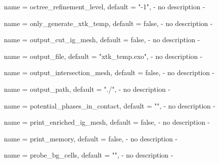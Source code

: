 \begin{parameter}{
    name    = {octree_refinement_level},
    default = {"-1"},
}
- no description -
\end{parameter}

\begin{parameter}{
    name    = {only_generate_xtk_temp},
    default = {false},
}
- no description -
\end{parameter}

\begin{parameter}{
    name    = {output_cut_ig_mesh},
    default = {false},
}
- no description -
\end{parameter}

\begin{parameter}{
    name    = {output_file},
    default = {"xtk_temp.exo"},
}
- no description -
\end{parameter}

\begin{parameter}{
    name    = {output_intersection_mesh},
    default = {false},
}
- no description -
\end{parameter}

\begin{parameter}{
    name    = {output_path},
    default = {"./"},
}
- no description -
\end{parameter}

\begin{parameter}{
    name    = {potential_phases_in_contact},
    default = {""},
}
- no description -
\end{parameter}

\begin{parameter}{
    name    = {print_enriched_ig_mesh},
    default = {false},
}
- no description -
\end{parameter}

\begin{parameter}{
    name    = {print_memory},
    default = {false},
}
- no description -
\end{parameter}

\begin{parameter}{
    name    = {probe_bg_cells},
    default = {""},
}
- no description -
\end{parameter}

